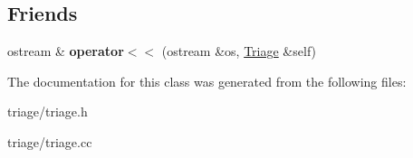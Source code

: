 \subsection*{Friends}
\begin{DoxyCompactItemize}
\item 
\mbox{\label{classsl2_1_1_triage_a0301fe6de62346a9a2472b9428f7dfd3}} 
ostream \& {\bfseries operator$<$$<$} (ostream \&os, \mbox{\hyperlink{classsl2_1_1_triage}{Triage}} \&self)
\end{DoxyCompactItemize}


The documentation for this class was generated from the following files\+:\begin{DoxyCompactItemize}
\item 
triage/triage.\+h\item 
triage/triage.\+cc\end{DoxyCompactItemize}
